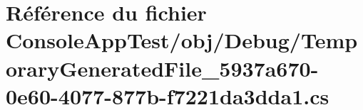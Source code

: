 \hypertarget{_console_app_test_2obj_2_debug_2_temporary_generated_file__5937a670-0e60-4077-877b-f7221da3dda1_8cs}{}\section{Référence du fichier Console\+App\+Test/obj/\+Debug/\+Temporary\+Generated\+File\+\_\+5937a670-\/0e60-\/4077-\/877b-\/f7221da3dda1.cs}
\label{_console_app_test_2obj_2_debug_2_temporary_generated_file__5937a670-0e60-4077-877b-f7221da3dda1_8cs}
